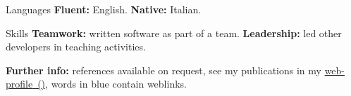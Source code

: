 
\begin{cvskills}

\cvskill
{Languages}
{\textbf{Fluent:} English. \textbf{Native:} Italian.}

\cvskill
{Skills}
{\textbf{Teamwork:} written software as part of a team. \textbf{Leadership:} 
led other developers in teaching activities.}

\end{cvskills}

\vspace{-1mm}
\flushleft
\footnotesize
\item {\color{awesome-red}\textbf{Fur}}{\color{awesome-darknight}\textbf{ther 
info:}} references available on request, see my publications in my 
{\href{https://www.ncl.ac.uk/engineering/staff/profile/alessandrode-gennaro.html}{{\color{myblue}web-profile}~(\profLogo\hspace{-0.8mm})}},
words in {\color{myblue}blue} contain weblinks.